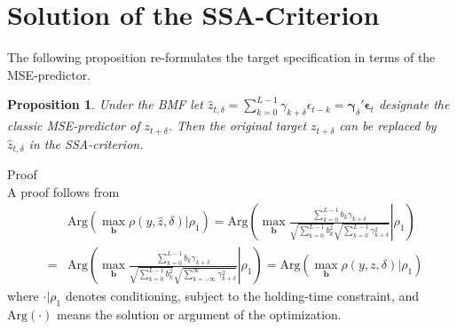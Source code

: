 \documentclass[a4paper]{article}
\newtheorem{Proposition}{Proposition}
\begin{document}









\section{Solution of the SSA-Criterion}\label{theorem_SSA}





The following proposition re-formulates the target specification in terms of the MSE-predictor. 
\begin{Proposition}
Under the BMF let $\hat{z}_{t,\delta}=\sum_{k=0}^{L-1}\gamma_{k+\delta}\epsilon_{t-k}=\boldsymbol{\gamma}_{\delta}'\boldsymbol{\epsilon}_{t}$ designate the classic MSE-predictor of $z_{t+\delta}$. Then the original target $z_{t+\delta}$ can be replaced by $\hat{z}_{t,\delta}$ in the SSA-criterion.
\end{Proposition}
Proof\\

A proof follows from 
\begin{eqnarray*}
&&\textrm{Arg}\left(\max_{\mathbf{b}}\rho(y,\hat{z},\delta)|\rho_1\right)=
\textrm{Arg}\left(\left.\max_{\mathbf{b}}\frac{\sum_{k=0}^{L-1}b_k\gamma_{k+\delta}}{\sqrt{\sum_{k=0}^{L-1}b_k^2}\sqrt{\sum_{k=0}^{L-1}\gamma_{k+\delta}^2}}\right|{\rho_1}\right)\\
&=&\textrm{Arg}\left(\left.\max_{\mathbf{b}}\frac{\sum_{k=0}^{L-1}b_k\gamma_{k+\delta}}{\sqrt{\sum_{k=0}^{L-1}b_k^2}\sqrt{\sum_{k=-\infty}^{\infty}\gamma_{k+\delta}^2}}\right|{\rho_1}\right)=\textrm{Arg}\left(\max_{\mathbf{b}}\rho(y,{z},\delta)|\rho_1\right)
\end{eqnarray*}
where $\cdot|\rho_1$ denotes conditioning, subject to the holding-time constraint, and $\textrm{Arg}(\cdot)$ means the solution or argument of the optimization. \\
\end{document}
